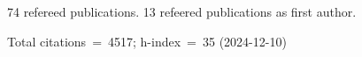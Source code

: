 74 refereed publications. 13 refeered publications as first author.

Total citations~=~4517; h-index~=~35 (2024-12-10)